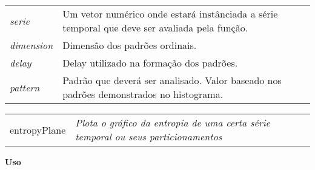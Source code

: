 \documentclass[12pt,letterpaper]{article}
\begin{document}
\begin{table}[!h]
\begin{center}
\begin{tabularx}{\textwidth}{X X}
\hspace{0.5cm} \textit{serie} \vspace{0.5cm}& Um vetor numérico onde estará instânciada a série temporal que deve ser avaliada pela função.\vspace{0.5cm}\\
\hspace{0.5cm} \textit{dimension} \vspace{0.5cm}& Dimensão dos padrões ordinais.\vspace{0.5cm}\\
\hspace{0.5cm} \textit{delay} \vspace{0.5cm}& Delay utilizado na formação dos padrões.\vspace{0.5cm}\\
\hspace{0.5cm} \textit{pattern} \vspace{0.5cm}& Padrão que deverá ser analisado. Valor baseado nos padrões demonstrados no histograma.\vspace{0.5cm}\\
\end{tabularx}
\end{center}
\end{table} 
\newpage

\hrulefill   

\begin{table}[!h]
\begin{center}
\begin{tabularx}{\textwidth}{ X X}
\hspace{0.5cm} entropyPlane & \textit{Plota o gráfico da entropia de uma certa série temporal ou seus particionamentos}\\
\end{tabularx}
\end{center}
\end{table} 

\vspace{-0.5cm}

\hrulefill  

\vspace{0.5cm}

\textbf{Uso}
\end{document}

